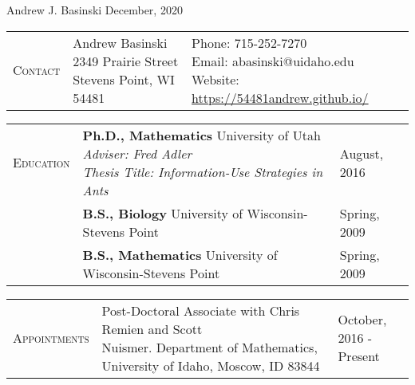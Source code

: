 \documentclass[11pt]{article}
\newcommand{\cellone}{3.5cm} %
\newcommand{\celltwo}{11cm}
\newcommand{\cellthree}{4cm}
\newcommand{\incellone}{3cm}
\newcommand{\incelltwo}{5cm}
\newcommand{\incellthree}{10cm}
\newcommand{\spa}{\vspace{.4in}}
\begin{document}
{\huge Andrew J. Basinski \hspace{2.5in} December, 2020}

\noindent\makebox[\linewidth]{\rule{\linewidth}{0.4pt}}

\spa

\begin{tabularx}{\textwidth}{p{\incellone} p{\incelltwo} p{\incellthree}}

  C\textsc{ontact} & \parbox[t]{5 cm}{Andrew Basinski \\ 2349 Prairie Street \\ Stevens Point, WI 54481} & \parbox[t]{8cm}{Phone: 715-252-7270\\
    Email: abasinski@uidaho.edu \\
    Website: \url{https://54481andrew.github.io/}
  } \\

\end{tabularx}

\spa

\begin{tabularx}{\textwidth}{p{\cellone} p{\celltwo} p{\cellthree}}
E\textsc{ducation} & \parbox[t]{\celltwo}{{\bf Ph.D., Mathematics} University of Utah \\  \emph{Adviser: Fred Adler} \\ \emph{Thesis Title: Information-Use Strategies in Ants}} &  August, 2016 \\[.5in]   

		          & \parbox[t][0cm]{13cm}{{\bf B.S., Biology} University of Wisconsin-Stevens Point} & Spring, 2009 \\
		          & \parbox[t]{13cm}{{\bf B.S., Mathematics} University of Wisconsin-Stevens Point} & Spring, 2009 \\
\end{tabularx}

\spa

\begin{tabularx}{\textwidth}{p{\cellone} p{\celltwo} p{\cellthree}}
    \parbox[t][0cm]{\cellone}{A\textsc{ppointments}}  & \parbox[t]{10cm}{Post-Doctoral Associate with Chris Remien and Scott \\ Nuismer. Department of Mathematics, University of Idaho, Moscow, ID 83844} & \parbox[t][]{\cellthree}{October, 2016 - \\ Present}
\end{tabularx}




\spa
\end{document}
